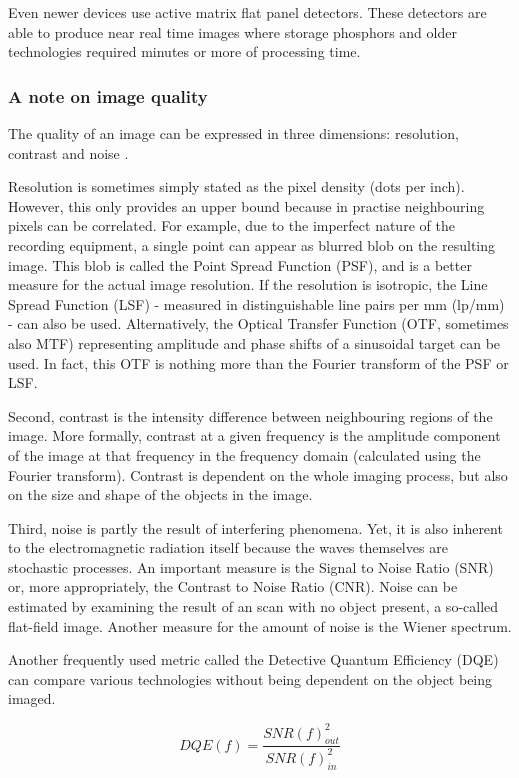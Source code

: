 Even newer devices use active matrix flat panel detectors. These detectors are
able to produce near real time images where storage phosphors and older
technologies required minutes or more of processing time.

\subsubsection{A note on image quality}\label{sssec:imgquality}
The quality of an image can be expressed in three dimensions: resolution,
contrast and noise \cite{suetens}.

Resolution is sometimes simply stated as the pixel density (dots per inch).
However, this only provides an upper bound because in practise neighbouring
pixels can be correlated. For example, due to the imperfect nature of the
recording equipment, a single point can appear as blurred blob on the resulting
image. This blob is called the Point Spread Function (PSF), and is a better
measure for the actual image resolution. If the resolution is isotropic, the
Line Spread Function (LSF) - measured in distinguishable line pairs per mm
(lp/mm) - can also be used. Alternatively, the Optical Transfer Function (OTF,
sometimes also MTF) representing amplitude and phase shifts of a sinusoidal
target can be used. In fact, this OTF is nothing more than the Fourier transform
of the PSF or LSF.

Second, contrast is the intensity difference between neighbouring regions of the
image. More formally, contrast at a given frequency is the amplitude component
of the image at that frequency in the frequency domain (calculated using the
Fourier transform). Contrast is dependent on the whole imaging process, but also
on the size and shape of the objects in the image. 

Third, noise is partly the result of interfering phenomena. Yet, it is also
inherent to the electromagnetic radiation itself because the waves themselves
are stochastic processes. An important measure is the Signal to Noise Ratio
(SNR) or, more appropriately, the Contrast to Noise Ratio (CNR). Noise can be
estimated by examining the result of an scan with no object present, a so-called
flat-field image. Another measure for the amount of noise is the Wiener
spectrum.

Another frequently used metric called the Detective Quantum Efficiency (DQE) can
compare various technologies without being dependent on the object being imaged.

\begin{equation}
DQE(f) = \frac{SNR(f)_{out}^2}{SNR(f)_{in}^2}
\end{equation}

